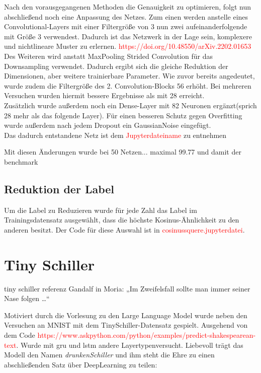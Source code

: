 \documentclass[
fontsize=12pt,					%
paper=a4,						%
twoside=true, 					%
listof=totoc, 					%
bibliography=totoc,				%
titlepage, 						%
headsepline, 					%
DIV=12,							%
BCOR=6mm,						%
cleardoublepage=empty,			%
parskip,							%
ngerman
]{scrartcl}
\begin{document}
Nach den vorausgegangenen Methoden die Genauigkeit zu optimieren, folgt nun abschließend noch eine Anpassung des Netzes. Zum einen werden anstelle eines Convolutional-Layers mit einer Filtergröße von 3 nun zwei aufeinanderfolgende mit Größe 3 verwendest. Dadurch ist das Netzwerk in der Lage sein, komplexere und nichtlineare Muster zu erlernen. \textcolor{red}{https://doi.org/10.48550/arXiv.2202.01653} Des Weiteren wird anstatt MaxPooling Strided Convolution für das Downsampling verwendet. Dadurch ergibt sich die gleiche Reduktion der Dimensionen, aber weitere trainierbare Parameter. Wie zuvor bereits angedeutet, wurde zudem die Filtergröße des 2. Convolution-Blocks 56 erhöht. Bei mehreren Versuchen wurden hiermit bessere Ergebnisse als mit 28 erreicht.\\
Zusätzlich wurde außerdem noch ein Dense-Layer mit 82 Neuronen ergänzt(sprich 28 mehr als das folgende Layer). Für einen besseren Schutz gegen Overfitting wurde außerdem nach jedem Dropout ein GaussianNoise eingefügt.\\
Das dadurch entstandene Netz ist dem \textcolor{red}{Jupyterdateiname} zu entnehmen

Mit diesen Änderungen wurde bei 50 Netzen...
maximal 99.77 und damit der benchmark

\subsection{Reduktion der Label}

Um die Label zu Reduzieren wurde für jede Zahl das Label im Trainingsdatensatz ausgewählt, dass die höchste Kosinus-Ähnlichkeit zu den anderen besitzt. Der Code für diese Auswahl ist in \textcolor{red}{cosinussquere.jupyterdatei}.

\section{Tiny Schiller}

tiny schiller referenz
Gandalf in Moria: „Im Zweifelsfall sollte man immer seiner Nase folgen …“

Motiviert durch die Vorlesung zu den Large Language Model wurde neben den Versuchen an MNIST mit dem TinySchiller-Datensatz \glqq gespielt\grqq. Ausgehend von dem Code \textcolor{red}{https://www.askpython.com/python/examples/predict-shakespearean-text}. Wurde mit gru und lstm andere Layertypenversucht. Liebevoll trägt das Modell den Namen \emph{drunkenSchiller} und ihm steht die Ehre zu einen abschließenden Satz über DeepLearning zu teilen:
\end{document}
